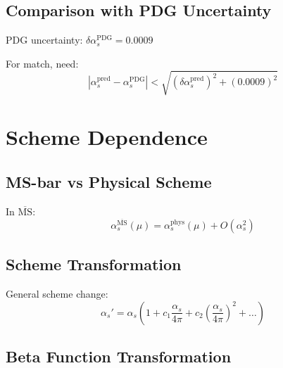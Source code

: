 \documentclass[11pt,a4paper]{article}
\theoremstyle{definition}
\begin{document}
\subsection{Comparison with PDG Uncertainty}
\label{subsec:compare-pdg-uncert}

\begin{quarantinebox}
PDG uncertainty: $\delta\alpha_s^{\text{PDG}} = 0.0009$

For match, need:
\begin{equation}
\label{eq:match-cond}
|\alpha_s^{\text{pred}} - \alpha_s^{\text{PDG}}| < \sqrt{(\delta\alpha_s^{\text{pred}})^2 + (0.0009)^2}
\end{equation}
\end{quarantinebox}

\section{Scheme Dependence}
\label{app:scheme-dep}

\subsection{MS-bar vs Physical Scheme}
\label{subsec:msbar-phys}

In $\overline{\text{MS}}$:
\begin{equation}
\label{eq:msbar-scheme}
\alpha_s^{\overline{\text{MS}}}(\mu) = \alpha_s^{\text{phys}}(\mu) + O(\alpha_s^2)
\end{equation}

\subsection{Scheme Transformation}
\label{subsec:scheme-transform}

General scheme change:
\begin{equation}
\label{eq:scheme-change}
\alpha_s' = \alpha_s \left(1 + c_1\frac{\alpha_s}{4\pi} + c_2\left(\frac{\alpha_s}{4\pi}\right)^2 + \ldots\right)
\end{equation}

\subsection{Beta Function Transformation}
\label{subsec:beta-transform}
\end{document}
